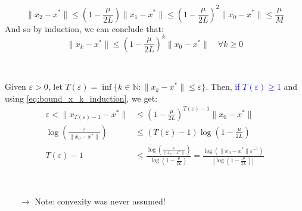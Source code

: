 \documentclass[12pt, openany]{report}
\theoremstyle{definition}
\begin{document}
\begin{equation}
	\|x_2 - x^*\| \leq  (1-\frac{\mu}{2L}) \|x_1-x^*\| \leq (1-\frac{\mu}{2L})^2 \|x_0-x^*\|\leq \frac{\mu}{M}
\end{equation} 
And so by induction, we can conclude that:
\begin{equation}\label{eq:bound_x_k_induction}
	\|x_k - x^*\| \leq \left(1-\frac{\mu}{2L}\right)^k \|x_0-x^*\| \quad \forall k \geq 0
\end{equation}
\begin{center}
	\color{red}\color{black}\\
\end{center}

Given $\varepsilon > 0$, let $T(\varepsilon) = \inf\{k\in \mathbb{N} : \|x_k -x^*\|\leq \varepsilon\}$. Then, \textcolor{blue}{if $T(\varepsilon) \geq 1$} and using \eqref{eq:bound_x_k_induction}, we get:
\begin{equation}
	\begin{aligned}
		\varepsilon < \|x_{T(\varepsilon)-1} - x^*\| &\leq \left(1-\frac{\mu}{2L}\right)^{T(\varepsilon)-1} \|x_0 - x^*\|\\
		\log \left(\frac{\varepsilon}{\|x_0 - x^*\|}\right) &\leq (T(\varepsilon)-1) \log \left(1-\frac{\mu}{2L}\right)\\
		T(\varepsilon)-1 &\leq \frac{\log \left(\frac{\varepsilon}{\|x_0 - x^*\|}\right)}{\log \left(1-\frac{\mu}{2L}\right)} = \frac{\log \left(\|x_0 - x^*\|\varepsilon^{-1}\right)}{|\log \left(1-\frac{\mu}{2L}\right)|}
	\end{aligned}
\end{equation}
\begin{center}
	\color{red}
	\color{black}\\
\end{center}
\begin{itemize}
	\item [$\rightarrow$] Note: convexity was never assumed!
\end{itemize}
\end{document}
